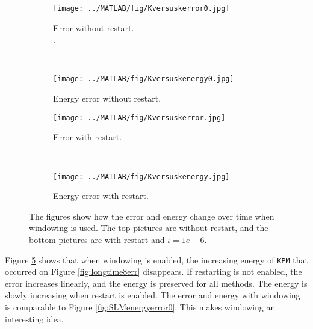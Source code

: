 \begin{figure}[H]
        \centering
        \begin{subfigure}[b]{0.3\textwidth}
                \texttt{[image: ../MATLAB/fig/Kversuskerror0.jpg]}
                \caption{ Error without restart. \\.}
                \label{fig:Kversuskerror0}
        \end{subfigure}
		~
		\begin{subfigure}[b]{0.3\textwidth}
                \texttt{[image: ../MATLAB/fig/Kversuskenergy0.jpg]}
                \caption{ Energy error without restart. }
                \label{fig:Kversuskenergy0}
        \end{subfigure}

        \begin{subfigure}[b]{0.3\textwidth}
                \texttt{[image: ../MATLAB/fig/Kversuskerror.jpg]}
                \caption{ Error with restart. }
                \label{fig:Kversuskerror}
        \end{subfigure}
		~
		\begin{subfigure}[b]{0.3\textwidth}
                \texttt{[image: ../MATLAB/fig/Kversuskenergy.jpg]}
                \caption{ Energy error with restart. }
                \label{fig:Kversuskenergy}
        \end{subfigure}        
        
        \caption{ The figures show how the error and energy change over time when windowing is used. The top pictures are without restart, and the bottom pictures are with restart and $\iota = 1e-6$. }
        \label{fig:Kversusk}
\end{figure}
\noindent Figure \ref{fig:Kversusk} shows that when windowing is enabled, the increasing energy of \texttt{KPM} that occurred on Figure \ref{fig:longtime8err} disappears. If restarting is not  enabled, the error increases linearly, and the energy is preserved for all methods. The energy is slowly increasing when restart is enabled. The error and energy with windowing is comparable to Figure \ref{fig:SLMenergyerror0}. This makes windowing an interesting idea.
